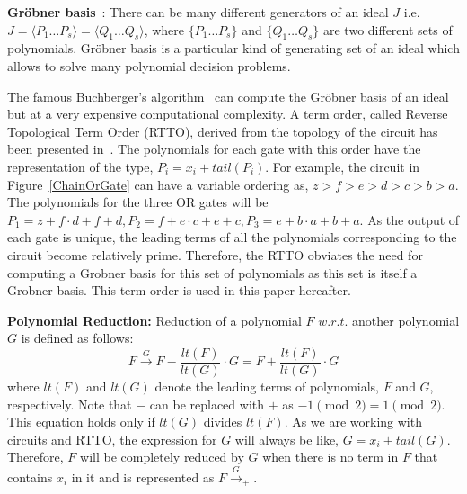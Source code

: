 \documentclass{article}
\theoremstyle{definition}
\begin{document}
\par 
\textbf{Gr\"obner basis}~\cite{lv}: There can be many different generators of an ideal $J$ i.e. $J = \langle P_1 \dots P_s \rangle = \langle Q_1 \dots Q_s \rangle$, where $\{P_1 \dots P_s\}$ and $\{Q_1 \dots Q_s\}$ are two different sets of polynomials. Gr\"obner basis is a particular kind of generating set of an ideal which allows to solve many polynomial decision problems. 
\par
The famous Buchberger's algorithm~\cite{Buchberger:1976} can compute the Gr\"obner basis of an ideal but at a very expensive computational complexity. 
A term order, called Reverse Topological Term Order (RTTO), derived from the topology of the circuit has been presented in~\cite{lv}. The polynomials for each gate with this order have the representation of the type, $P_i = x_i + tail(P_i)$. For example, the circuit in Figure~\ref{ChainOrGate} can have a variable ordering as, $z > f > e>d>c>b>a$. The polynomials for the three OR gates will be $P_1 = z + f\cdot d + f +d, P_2 = f + e\cdot c + e +c , P_3 = e + b\cdot a + b + a$. As the output of each gate is unique, the leading terms of all the polynomials corresponding to the circuit become relatively prime. Therefore, the RTTO obviates the need for computing a Grobner basis for this set of polynomials as this set is itself a Grobner basis. This term order is used in this paper hereafter.

\par
\textbf{Polynomial Reduction:} Reduction of a polynomial $F$ $w.r.t.$ another polynomial $G$ is defined as follows:
\begin{equation}
F \xrightarrow{G} F - \frac{lt(F)}{lt(G)} \cdot G = F + \frac{lt(F)}{lt(G)} \cdot G
\end{equation}
where $lt(F)$ and $lt(G)$ denote the leading terms of polynomials, $F$ and $G$, respectively. Note that $-$ can be replaced with $+$ as $-1 \pmod{2} = 1 \pmod{2}$. This equation holds only if $lt(G)$ divides $lt(F)$. As we are working with circuits and RTTO, the expression for $G$ will always be like, $G = x_i + tail(G)$. Therefore, $F$ will be completely reduced by $G$ when there is no term in $F$ that contains $x_i$ in it and is represented as $F \xrightarrow{G}_{+}$.
\end{document}
